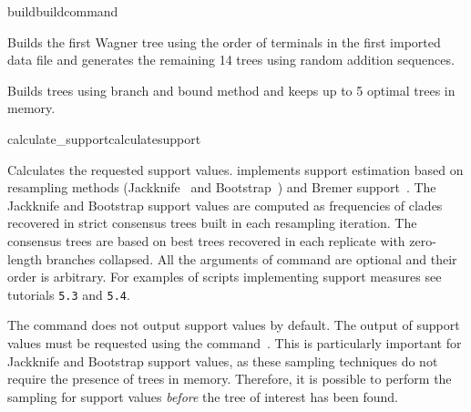 \begin{command}{build}{buildcommand}
\begin{poyexamples}
            {Builds the first Wagner tree using the order of terminals in the first
            imported data file and generates the remaining
            14 trees using random addition sequences.}
            
            {Builds trees using branch and bound method and keeps up to
            5 optimal trees in memory.}
                    
	\end{poyexamples}

\end{command}

\begin{command}{calculate\_support}{calculatesupport}


	\begin{poydescription} 
            Calculates the requested support values. \poy implements support
            estimation based on resampling methods (Jackknife~\cite{Farrisetal1996} 
            and Bootstrap~\cite{Felsenstein1985}) and Bremer support~\cite{Bremer1988, Kallersjoetal1992}. 
            The Jackknife and Bootstrap support values are computed as
            frequencies of clades recovered in strict consensus trees built in each resampling
            iteration. The consensus trees are based on best trees recovered in each replicate
            with zero-length branches collapsed.
            All the arguments of  command are optional and
            their order is arbitrary.  For examples of scripts implementing support measures see 
           tutorials \texttt{5.3} and \texttt{5.4}. 
            
	  The  command does not output support 
	  values by default. The output of support values must be requested using 
	  the command~. This is particularly important for Jackknife 
	  and Bootstrap support values, as these sampling techniques
            do not require the presence of trees in memory. Therefore, it is possible to 
            perform the sampling for support values \emph{before}
            the tree of interest has been found.
                    \end{poydescription}
            

\end{command}
